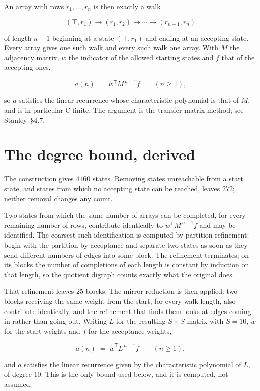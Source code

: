 \documentclass[11pt]{article}
\theoremstyle{definition}
\begin{document}
An array with rows $r_1,\dots,r_n$ is then exactly a walk

\[(\top,r_1) \to (r_1,r_2) \to \cdots \to (r_{n-1},r_n)\]

of length $n-1$ beginning at a state $(\top,r_1)$ and ending at an accepting state. Every array gives one such walk and every such walk one array. With $M$ the adjacency matrix, $w$ the indicator of the allowed starting states and $f$ that of the accepting ones,

\[a(n) \;=\; w^{\mathsf T} M^{\,n-1} f \qquad (n \ge 1),\]

so $a$ satisfies the linear recurrence whose characteristic polynomial is that of $M$, and is in particular C-finite. The argument is the transfer-matrix method; see Stanley~\S4.7.

\section{The degree bound, derived}

The construction gives $4160$ states. Removing states unreachable from a start state, and states from which no accepting state can be reached, leaves $272$; neither removal changes any count.

Two states from which the same number of arrays can be completed, for every remaining number of rows, contribute identically to $w^{\mathsf T}M^{\,n-1}f$ and may be identified. The coarsest such identification is computed by partition refinement: begin with the partition by acceptance and separate two states as soon as they send different numbers of edges into some block. The refinement terminates; on its blocks the number of completions of each length is constant by induction on that length, so the quotient digraph counts exactly what the original does.

That refinement leaves $25$ blocks. The mirror reduction is then applied: two blocks receiving the same weight from the start, for every walk length, also contribute identically, and the refinement that finds them looks at edges coming in rather than going out. Writing $L$ for the resulting $S \times S$ matrix with $S = 10$, $\tilde w$ for the start weights and $\tilde f$ for the acceptance weights,

\[a(n) \;=\; \tilde w^{\mathsf T} L^{\,n-1} \tilde f \qquad (n \ge 1),\]

and $a$ satisfies the linear recurrence given by the characteristic polynomial of $L$, of degree $10$. This is the only bound used below, and it is computed, not assumed.
\end{document}
